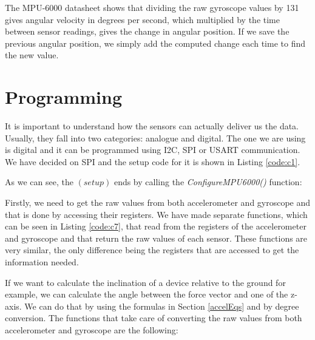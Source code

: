The MPU-6000 datasheet\cite{MPU6000} shows that dividing the raw gyroscope values by 131 gives angular velocity in degrees per second, which multiplied by the time between sensor readings, gives the change in angular position. If we save the previous angular position, we simply add the computed change each time to find the new value.


\section{Programming}
It is important to understand how the sensors can actually deliver us the data. Usually, they fall into two categories: analogue and digital. The one we are using is digital and it can be programmed using I2C, SPI or USART communication. We have decided on SPI and the setup code for it is shown in Listing \ref{code:c1}.
\clearpage


As we can see, the $(setup)$ ends by calling the \textit{ConfigureMPU6000()} function:


\clearpage
Firstly, we need to get the raw values from both accelerometer and gyroscope and that is done by accessing their registers. We have made separate functions, which can be seen in Listing \ref{code:c7}, that read from the registers of the accelerometer and gyroscope and that return the raw values of each sensor. These functions are very similar, the only difference being the registers that are accessed to get the information needed. 



If we want to calculate the inclination of a device relative to the ground for example, we can calculate the angle between the force vector and one of the z-axis. We can do that by using the formulas in Section \ref{accelEqs} and by degree conversion. The functions that take care of converting the raw values from both accelerometer and gyroscope are the following:



